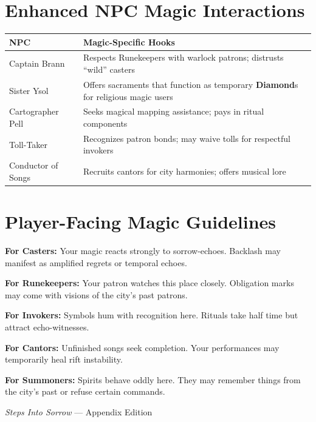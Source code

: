 \documentclass[11pt]{article}
\newcommand{\Term}[1]{\textbf{#1}}
\newcommand{\Diamond}{\Term{Diamond}}
\begin{document}
\section{Enhanced NPC Magic Interactions}
\label{app:npc-magic}
\begin{tabularx}{\linewidth}{@{}l X@{}}
\toprule
\textbf{NPC} & \textbf{Magic-Specific Hooks}\\
\midrule
Captain Brann & Respects Runekeepers with warlock patrons; distrusts ``wild'' casters\\
Sister Ysol & Offers sacraments that function as temporary \Diamond{}s for religious magic users\\
Cartographer Pell & Seeks magical mapping assistance; pays in ritual components\\
Toll-Taker & Recognizes patron bonds; may waive tolls for respectful invokers\\
Conductor of Songs & Recruits cantors for city harmonies; offers musical lore\\
\bottomrule
\end{tabularx}

\section{Player-Facing Magic Guidelines}
\label{app:player-magic}
\textbf{For Casters:} Your magic reacts strongly to sorrow-echoes. Backlash may manifest as amplified regrets or temporal echoes.

\medskip
\textbf{For Runekeepers:} Your patron watches this place closely. Obligation marks may come with visions of the city's past patrons.

\medskip
\textbf{For Invokers:} Symbols hum with recognition here. Rituals take half time but attract echo-witnesses.

\medskip
\textbf{For Cantors:} Unfinished songs seek completion. Your performances may temporarily heal rift instability.

\medskip
\textbf{For Summoners:} Spirits behave oddly here. They may remember things from the city's past or refuse certain commands.

\vfill
\begin{center}
\small{\emph{Steps Into Sorrow} --- Appendix Edition}
\end{center}
\end{document}
